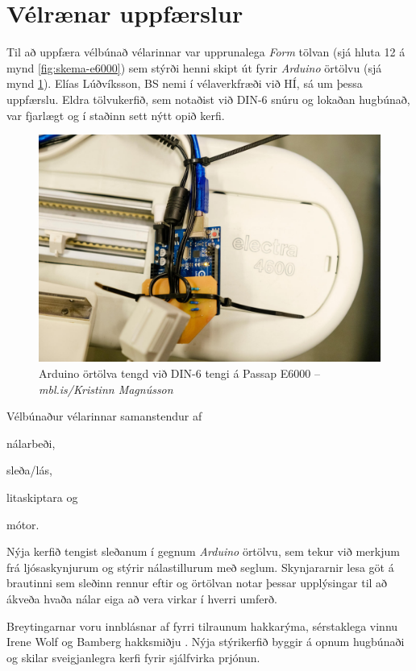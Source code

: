 \documentclass[a4paper,10pt,twocolumn]{article}
\begin{document}
\section{Vélrænar uppfærslur}
Til að uppfæra vélbúnað vélarinnar var upprunalega \emph{Form} tölvan (sjá hluta 12 á mynd \ref{fig:skema-e6000}) sem stýrði henni skipt út fyrir \emph{Arduino} örtölvu (sjá mynd \ref{fig:arduino}). Elías Lúðvíksson, BS nemi í vélaverkfræði við HÍ, sá um þessa uppfærslu. Eldra tölvukerfið, sem notaðist við DIN-6 snúru og lokaðan hugbúnað, var fjarlægt og í staðinn sett nýtt opið kerfi.

\begin{figure}
    \centering
    \includegraphics[width=\linewidth]{figs/arduino.jpg}
    \caption{Arduino örtölva tengd við DIN-6 tengi á Passap E6000 -- \textit{mbl.is/Kristinn Magnússon}}
    \label{fig:arduino}
\end{figure}

Vélbúnaður vélarinnar samanstendur af \begin{enumerate*}[label=(\roman*)] 
\item nálarbeði, \item sleða/lás, \item litaskiptara og \item mótor. 
\end{enumerate*} Nýja kerfið tengist sleðanum í gegnum \textit{Arduino} örtölvu, sem tekur við merkjum frá ljósaskynjurum og stýrir nálastillurum með seglum. Skynjararnir lesa göt á brautinni sem sleðinn rennur eftir og örtölvan notar þessar upplýsingar til að ákveða hvaða nálar eiga að vera virkar í hverri umferð.

Breytingarnar voru innblásnar af fyrri tilraunum hakkarýma, sérstaklega vinnu Irene Wolf og Bamberg hakksmiðju \cite{wolf, bamberg}. Nýja stýrikerfið byggir á opnum hugbúnaði og skilar sveigjanlegra kerfi fyrir sjálfvirka prjónun. 
\end{document}
